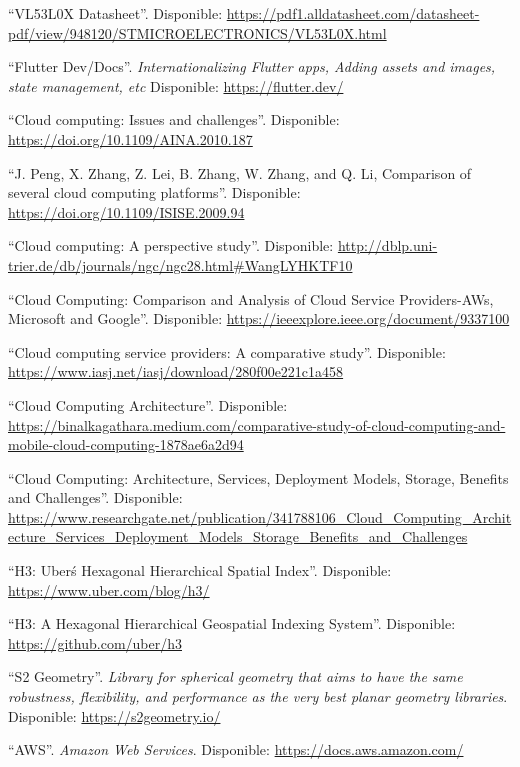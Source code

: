 \begin{references}
    “VL53L0X Datasheet”. Disponible: \url{https://pdf1.alldatasheet.com/datasheet-pdf/view/948120/STMICROELECTRONICS/VL53L0X.html}

    “Flutter Dev/Docs”. \textit{Internationalizing Flutter apps, Adding assets and images, state management, etc} Disponible: \url{https://flutter.dev/}

    “Cloud computing: Issues and challenges”. Disponible: \url{https://doi.org/10.1109/AINA.2010.187}

    “J. Peng, X. Zhang, Z. Lei, B. Zhang, W. Zhang, and Q. Li, Comparison of several cloud computing platforms”. Disponible: \url{https://doi.org/10.1109/ISISE.2009.94}

    “Cloud computing: A perspective study”. Disponible: \url{http://dblp.uni-trier.de/db/journals/ngc/ngc28.html#WangLYHKTF10}

    “Cloud Computing: Comparison and Analysis of Cloud Service Providers-AWs, Microsoft and Google”. Disponible: \url{https://ieeexplore.ieee.org/document/9337100}

    “Cloud computing service providers: A comparative study”. Disponible: \url{https://www.iasj.net/iasj/download/280f00e221c1a458}

    “Cloud Computing Architecture”. Disponible: \url{https://binalkagathara.medium.com/comparative-study-of-cloud-computing-and-mobile-cloud-computing-1878ae6a2d94}

    “Cloud Computing: Architecture, Services, Deployment Models, Storage, Benefits and Challenges”. Disponible: \url{https://www.researchgate.net/publication/341788106_Cloud_Computing_Architecture_Services_Deployment_Models_Storage_Benefits_and_Challenges}

    “H3: Uber\'s Hexagonal Hierarchical Spatial Index”. Disponible: \url{https://www.uber.com/blog/h3/}

    “H3: A Hexagonal Hierarchical Geospatial Indexing System”. Disponible: \url{https://github.com/uber/h3}

    “S2 Geometry”. \textit{Library for spherical geometry that aims to have the same robustness, flexibility, and performance as the very best planar geometry libraries}. Disponible: \url{https://s2geometry.io/}

    “AWS”. \textit{Amazon Web Services}. Disponible: \url{https://docs.aws.amazon.com/}


\end{references}

